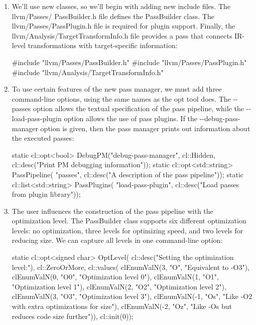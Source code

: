 \begin{enumerate}
\item
We’ll use new classes, so we’ll begin with adding new include files. The llvm/Passes/ PassBuilder.h file defines the PassBuilder class. The llvm/Passes/PassPlugin.h file is required for plugin support. Finally, the llvm/Analysis/TargetTransformInfo.h file provides a pass that connects IR-level transformations with target-specific information:

\begin{cpp}
#include "llvm/Passes/PassBuilder.h"
#include "llvm/Passes/PassPlugin.h"
#include "llvm/Analysis/TargetTransformInfo.h"
\end{cpp}

\item
To use certain features of the new pass manager, we must add three command-line options, using the same names as the opt tool does. The -{}-passes option allows the textual specification of the pass pipeline, while the -{}-load-pass-plugin option allows the use of pass plugins. If the -{}-debug-pass-manager option is given, then the pass manager prints out information about the executed passes:

\begin{cpp}
static cl::opt<bool>
    DebugPM("debug-pass-manager", cl::Hidden,
        cl::desc("Print PM debugging information"));
static cl::opt<std::string> PassPipeline(
    "passes",
    cl::desc("A description of the pass pipeline"));
static cl::list<std::string> PassPlugins(
    "load-pass-plugin",
    cl::desc("Load passes from plugin library"));
\end{cpp}

\item
The user influences the construction of the pass pipeline with the optimization level. The PassBuilder class supports six different optimization levels: no optimization, three levels for optimizing speed, and two levels for reducing size. We can capture all levels in one command-line option:

\begin{cpp}
static cl::opt<signed char> OptLevel(
    cl::desc("Setting the optimization level:"),
    cl::ZeroOrMore,
    cl::values(
        clEnumValN(3, "O", "Equivalent to -O3"),
        clEnumValN(0, "O0", "Optimization level 0"),
        clEnumValN(1, "O1", "Optimization level 1"),
        clEnumValN(2, "O2", "Optimization level 2"),
        clEnumValN(3, "O3", "Optimization level 3"),
        clEnumValN(-1, "Os", "Like -O2 with extra optimizations for size"),
        clEnumValN(-2, "Oz", "Like -Os but reduces code size further")),
        cl::init(0));
\end{cpp}


\end{enumerate}
